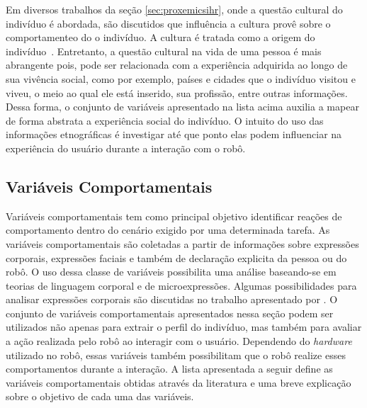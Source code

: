 Em diversos trabalhos da seção \ref{sec:proxemicsihr}, onde a questão cultural do indivíduo é abordada, são discutidos que influência a cultura provê sobre o comportamenteo do o indivíduo. A cultura é tratada como a origem do indivíduo~\cite{eresha:2013}. Entretanto, a questão cultural na vida de uma pessoa é mais abrangente pois, pode ser relacionada com a experiência adquirida ao longo de sua vivência social, como por exemplo, países e cidades que o indivíduo visitou e viveu, o meio ao qual ele está inserido, sua profissão, entre outras informações. Dessa forma, o conjunto de variáveis apresentado na lista acima auxilia a mapear de forma abstrata a experiência social do indivíduo. O intuito do uso das informações etnográficas é investigar até que ponto elas podem influenciar na experiência do usuário durante a interação com o robô.

\subsection{Variáveis Comportamentais}
\label{sec:reacoes}
Variáveis comportamentais tem como principal objetivo identificar reações de comportamento dentro do cenário exigido por uma determinada tarefa. As variáveis comportamentais são coletadas a partir de informações sobre expressões corporais, expressões faciais e também de declaração explicita da pessoa ou do robô. O uso dessa classe de variáveis possibilita uma análise baseando-se em teorias de linguagem corporal e de microexpressões. Algumas possibilidades para analisar expressões corporais são discutidas no trabalho apresentado por . O conjunto de variáveis comportamentais apresentados nessa seção podem ser utilizados não apenas para extrair o perfil do indivíduo, mas também para avaliar a ação realizada pelo robô ao interagir com o usuário. Dependendo do \emph{hardware} utilizado no robô, essas variáveis também possibilitam que o robô realize esses comportamentos durante a interação. A lista apresentada a seguir define as variáveis comportamentais obtidas através da literatura e uma breve explicação sobre o objetivo de cada uma das variáveis.

